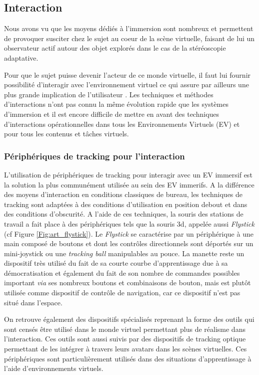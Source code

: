 \subsection{Interaction}

Nous avons vu que les moyens dédiés à l'immersion sont nombreux et permettent de provoquer susciter chez le sujet au coeur de la scène virtuelle, faisant de lui un observateur actif autour des objet explorés dans le cas de la stéréoscopie adaptative.

Pour que le sujet puisse devenir l'acteur de ce monde virtuelle, il faut lui fournir
 possibilité d'interagir avec l'environnement virtuel ce qui assure par ailleurs une plus grande implication de l'utilisateur \cite{steuer1995defining}. Les techniques et méthodes d'interactions n'ont pas connu la même évolution rapide que les systèmes d'immersion et il est encore difficile de mettre en avant des techniques d'interactions opérationnelles dans tous les Environnements Virtuels (EV) et pour tous les contenus et tâches virtuels.

\subsubsection{Périphériques de tracking pour l'interaction} \label{peripheriques}

L'utilisation de périphériques de tracking pour interagir avec un EV immersif est la solution la plus communément utilisée au sein des EV immerifs. A la différence des moyens d'interaction en conditions classiques de bureau, les techniques de tracking sont adaptées à des conditions d'utilisation en position debout et dans des conditions d'obscurité. A l'aide de ces techniques, la souris des stations de travail a fait place à des périphériques tels que la souris 3d, appelée aussi \textit{Flystick} (cf Figure \ref{Fig:art_flystick}). Le \textit{Flystick} se caractérise par un périphérique à une main composé de boutons et dont les contrôles directionnels sont déportés sur un mini-joystick ou une \textit{tracking ball} manipulables au pouce. La manette reste un dispositif très utilisé du fait de sa courte courbe d'apprentissage due à sa démocratisation et également du fait de son nombre de commandes possibles important \textit{via} ses nombreux boutons et combinaisons de bouton, mais est plutôt utilisée comme dispositif de contrôle de navigation, car ce dispositif n'est pas situé dans l'espace.

On retrouve également des dispositifs spécialisés reprenant la forme des outils qui sont censés être utilisé dans le monde virtuel permettant plus de réalisme dans l'interaction. Ces outils sont aussi suivis par des dispositifs de tracking optique permettant de les intégrer à travers leurs avatars dans les scènes virtuelles. Ces périphériques sont particulièrement utilisés dans des situations d'apprentissage à l'aide d'environnements virtuels.

